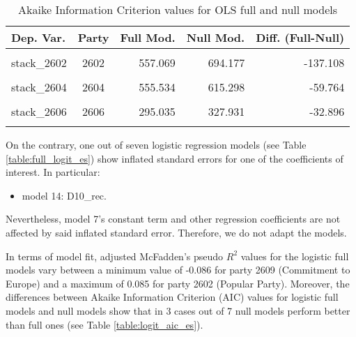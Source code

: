 \documentclass[
]{article}
\providecommand{\tightlist}{%
  \setlength{\itemsep}{0pt}\setlength{\parskip}{0pt}}
\begin{document}
\begin{table}[!h]

\caption{\label{tab:unnamed-chunk-171}Akaike Information Criterion values for OLS full and null models 
        \label{table:ols_aic_es}}
\centering
\begin{tabular}[t]{lcrrr}
\toprule
Dep. Var. & Party & Full Mod. & Null Mod. & Diff. (Full-Null)\\
\midrule
\cellcolor{gray!6}{stack\_2601} & \cellcolor{gray!6}{2601} & \cellcolor{gray!6}{705.870} & \cellcolor{gray!6}{725.668} & \cellcolor{gray!6}{-19.798}\\
stack\_2602 & 2602 & 557.069 & 694.177 & -137.108\\
\cellcolor{gray!6}{stack\_2603} & \cellcolor{gray!6}{2603} & \cellcolor{gray!6}{594.433} & \cellcolor{gray!6}{689.794} & \cellcolor{gray!6}{-95.361}\\
stack\_2604 & 2604 & 555.534 & 615.298 & -59.764\\
\cellcolor{gray!6}{stack\_2605} & \cellcolor{gray!6}{2605} & \cellcolor{gray!6}{406.763} & \cellcolor{gray!6}{515.855} & \cellcolor{gray!6}{-109.092}\\
\addlinespace
stack\_2606 & 2606 & 295.035 & 327.931 & -32.896\\
\cellcolor{gray!6}{stack\_2609} & \cellcolor{gray!6}{2609} & \cellcolor{gray!6}{225.770} & \cellcolor{gray!6}{262.243} & \cellcolor{gray!6}{-36.474}\\
\bottomrule
\end{tabular}
\end{table}

On the contrary, one out of seven logistic regression models (see Table \ref{table:full_logit_es}) show inflated standard errors for one of the coefficients of interest. In particular:

\begin{itemize}
\tightlist
\item
  model 14: D10\_rec.
\end{itemize}

Nevertheless, model 7's constant term and other regression coefficients are not affected by said inflated standard error. Therefore, we do not adapt the models.

In terms of model fit, adjusted McFadden's pseudo \(R^2\) values for the logistic full models vary between
a minimum value of
-0.086
for party 2609
(Commitment to Europe)
and a maximum of
0.085
for party 2602
(Popular Party).
Moreover, the differences between Akaike Information Criterion (AIC) values for logistic full models and null models show that in 3 cases out of 7 null models perform better than full ones (see Table \ref{table:logit_aic_es}).
\end{document}
